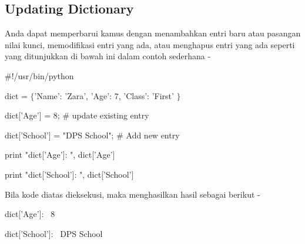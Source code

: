 \documentclass[a4paper,12pt]{report}
\begin{document}
\subsection*{Updating Dictionary}
 \par
\begin{adjustwidth}{0.03in}{0.03in}
Anda dapat memperbarui kamus dengan menambahkan entri baru atau pasangan nilai kunci, memodifikasi entri yang ada, atau menghapus entri yang ada seperti yang ditunjukkan di bawah ini dalam contoh sederhana -\end{adjustwidth}
 \par
\noindent 
 \hspace*{0.5in}  $  \#  $!/usr/bin/python \par
\vspace{12pt}
\noindent 
 \hspace*{0.5in} dict =  $  \{  $'Name': 'Zara', 'Age': 7, 'Class': 'First' $  \}  $ \par
\vspace{12pt}
\noindent 
 \hspace*{0.5in} dict['Age'] = 8;  $  \#  $ update existing entry \par
\noindent 
 \hspace*{0.5in} dict['School'] = "DPS School";  $  \#  $ Add new entry \par
\vspace{12pt}
\vspace{12pt}
\noindent 
 \hspace*{0.5in} print "dict['Age']: ", dict['Age'] \par
\noindent 
 \hspace*{0.5in} print "dict['School']: ", dict['School'] \par
\begin{adjustwidth}{0.03in}{0.03in}
Bila kode diatas dieksekusi, maka menghasilkan hasil sebagai berikut -\end{adjustwidth}
 \par
\noindent 
{\fontsize{9pt}{9pt}\selectfont  \hspace*{0.5in} dict['Age']:~ 8} \par
\noindent 
{\fontsize{9pt}{9pt}\selectfont  \hspace*{0.5in} dict['School']:~ DPS School} \par
\vspace{12pt}
\vspace{12pt}
\end{document}
